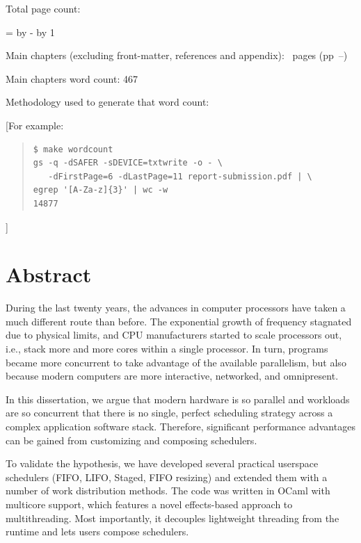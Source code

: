 \documentclass[12pt,a4paper,twoside]{report}
\begin{document}
\begin{sffamily}
Total page count: \pageref{lastpage}

\makeatletter
\@tempcnta=\relax%
\advance\@tempcnta by -%
\advance\@tempcnta by 1%
\xdef\contentpages{\the\@tempcnta}%
\makeatother

Main chapters (excluding front-matter, references and appendix):
\contentpages~pages
(pp~\pageref{firstcontentpage}--\pageref{lastcontentpage})

Main chapters word count: 467

Methodology used to generate that word count:

[For example:

\begin{quote}
\begin{verbatim}
$ make wordcount
gs -q -dSAFER -sDEVICE=txtwrite -o - \
   -dFirstPage=6 -dLastPage=11 report-submission.pdf | \
egrep '[A-Za-z]{3}' | wc -w
14877
\end{verbatim}
\end{quote}

]

\end{sffamily}

\onehalfspacing

\chapter*{Abstract}

During the last twenty years, the advances in computer processors have taken a much different route than before. The exponential growth of frequency stagnated due to physical limits, and CPU manufacturers started to scale processors out, i.e., stack more and more cores within a single processor. In turn, programs became more concurrent to take advantage of the available parallelism, but also because modern computers are more interactive, networked, and omnipresent. 

In this dissertation, we argue that modern hardware is so parallel and workloads are so concurrent that there is no single, perfect scheduling strategy across a complex application software stack. Therefore, significant performance advantages can be gained from customizing and composing schedulers.

To validate the hypothesis, we have developed several practical userspace schedulers (FIFO, LIFO, Staged, FIFO resizing) and extended them with a number of work distribution methods. The code was written in OCaml with multicore support, which features a novel effects-based approach to multithreading. Most importantly, it decouples lightweight threading from the runtime and lets users compose schedulers. 
\end{document}
